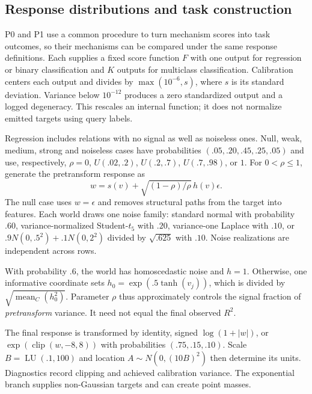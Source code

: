 \documentclass[11pt]{article}
\begin{document}
\subsection{Response distributions and task construction}

P0 and P1 use a common procedure to turn mechanism scores into task outcomes, so their mechanisms can be compared under the same response definitions. Each supplies a fixed score function $F$ with one output for regression or binary classification and $K$ outputs for multiclass classification. Calibration centers each output and divides by $\max(10^{-6},s)$, where $s$ is its standard deviation. Variance below $10^{-12}$ produces a zero standardized output and a logged degeneracy. This rescales an internal function; it does not normalize emitted targets using query labels.

Regression includes relations with no signal as well as noiseless ones. Null, weak, medium, strong and noiseless cases have probabilities $(.05,.20,.45,.25,.05)$ and use, respectively, $\rho=0$, $U(.02,.2)$, $U(.2,.7)$, $U(.7,.98)$, or $1$. For $0<\rho\leq1$, generate the pretransform response as
\[
w=s(v)+\sqrt{(1-\rho)/\rho}\,h(v)\epsilon.
\]
The null case uses $w=\epsilon$ and removes structural paths from the target into features. Each world draws one noise family: standard normal with probability $.60$, variance-normalized Student-$t_5$ with $.20$, variance-one Laplace with $.10$, or $.9N(0,.5^2)+.1N(0,2^2)$ divided by $\sqrt{.625}$ with $.10$. Noise realizations are independent across rows.

With probability $.6$, the world has homoscedastic noise and $h=1$. Otherwise, one informative coordinate sets $h_0=\exp(.5\tanh(v_j))$, which is divided by $\sqrt{\operatorname{mean}_{C}(h_0^2)}$. Parameter $\rho$ thus approximately controls the signal fraction of \emph{pretransform} variance. It need not equal the final observed $R^2$.

The final response is transformed by identity, signed $\log(1+|w|)$, or $\exp(\operatorname{clip}(w,-8,8))$ with probabilities $(.75,.15,.10)$. Scale $B=\operatorname{LU}(.1,100)$ and location $A\sim N(0,(10B)^2)$ then determine its units. Diagnostics record clipping and achieved calibration variance. The exponential branch supplies non-Gaussian targets and can create point masses.
\end{document}
